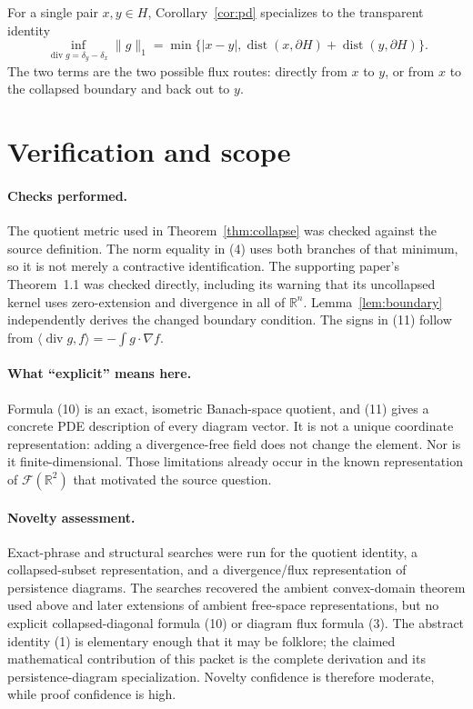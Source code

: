 \documentclass[11pt]{article}
\newcommand{\F}{\mathcal F}
\newcommand{\R}{\mathbb R}
\newcommand{\dist}{\operatorname{dist}}
\newcommand{\diver}{\operatorname{div}}
\begin{document}
For a single pair $x,y\in H$, Corollary~\ref{cor:pd} specializes to the
transparent identity
\[
 \inf_{\diver g=\delta_y-\delta_x}\|g\|_1
 =\min\{|x-y|,\dist(x,\partial H)+\dist(y,\partial H)\}.
\]
The two terms are the two possible flux routes: directly from $x$ to $y$, or
from $x$ to the collapsed boundary and back out to $y$.

\section*{Verification and scope}

\paragraph{Checks performed.}
The quotient metric used in Theorem~\ref{thm:collapse} was checked against
the source definition.  The norm equality in (4) uses both branches of that
minimum, so it is not merely a contractive identification.  The supporting
paper's Theorem~1.1 was checked directly, including its warning that its
uncollapsed kernel uses zero-extension and divergence in all of $\R^n$.
Lemma~\ref{lem:boundary} independently derives the changed boundary
condition.  The signs in (11) follow from
$\langle\diver g,f\rangle=-\int g\cdot\nabla f$.

\paragraph{What ``explicit'' means here.}
Formula (10) is an exact, isometric Banach-space quotient, and (11) gives a
concrete PDE description of every diagram vector.  It is not a unique
coordinate representation: adding a divergence-free field does not change
the element.  Nor is it finite-dimensional.  Those limitations already
occur in the known representation of $\F(\R^2)$ that motivated the source
question.

\paragraph{Novelty assessment.}
Exact-phrase and structural searches were run for the quotient identity, a
collapsed-subset representation, and a divergence/flux representation of
persistence diagrams.  The searches recovered the ambient convex-domain
theorem used above and later extensions of ambient free-space
representations, but no explicit collapsed-diagonal formula (10) or diagram
flux formula (3).  The abstract identity (1) is elementary enough that it may
be folklore; the claimed mathematical contribution of this packet is the
complete derivation and its persistence-diagram specialization.  Novelty
confidence is therefore moderate, while proof confidence is high.
\end{document}
